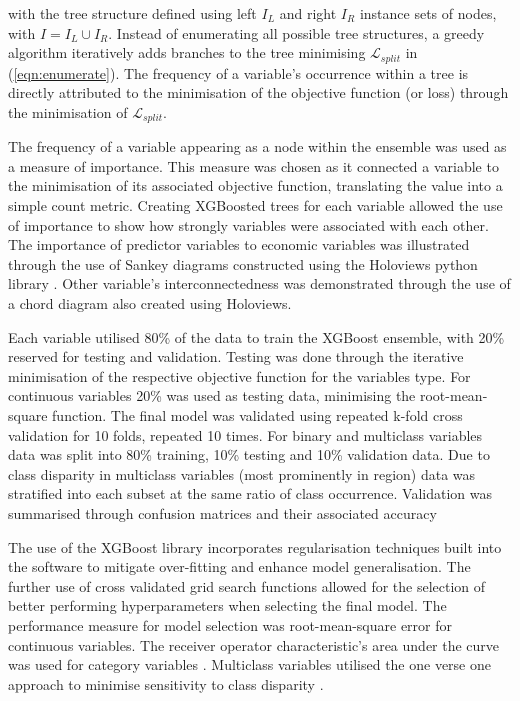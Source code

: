 \documentclass[review,12pt,authoryear]{elsarticle}
\begin{document}
\begin{linenumbers}
with the tree structure defined using left $I_L$ and right $I_R$ instance sets of nodes, with $I = I_L \cup I_R$. Instead of enumerating all possible tree structures, a greedy algorithm iteratively adds branches to the tree minimising $ \mathcal{L}_{split} $ in (\ref{eqn:enumerate}). The frequency of a variable's occurrence within a tree is directly attributed to the minimisation of the objective function (or loss) through the minimisation of  $ \mathcal{L}_{split} $.
\par
The frequency of a variable appearing as a node within the ensemble was used as a measure of importance. This measure was chosen as it connected a variable to the minimisation of its associated objective function, translating the value into a simple count metric. Creating XGBoosted trees for each variable allowed the use of importance to show how strongly variables were associated with each other. The importance of predictor variables to economic variables was illustrated through the use of Sankey diagrams constructed using the Holoviews python library \citep{philipp_rudiger_2020_3904606}. Other variable's interconnectedness was demonstrated through the use of a chord diagram also created using Holoviews.
\par
Each variable utilised 80\% of the data to train the XGBoost ensemble, with 20\% reserved for testing and validation. Testing was done through the iterative minimisation of the respective objective function for the variables type. For continuous variables 20\% was used as testing data, minimising the root-mean-square function. The final model was validated using repeated k-fold cross validation for 10 folds, repeated 10 times.
 For  binary and multiclass variables data was split into 80\% training, 10\% testing and 10\% validation data. Due to class disparity in multiclass variables (most prominently in region) data was stratified into each subset at the same ratio of class occurrence. Validation was summarised through confusion matrices and their associated accuracy 
\par
The use of the XGBoost library incorporates regularisation techniques built into the software to mitigate over-fitting and enhance model generalisation. The further use of cross validated grid search functions allowed for the selection of better performing hyperparameters when selecting the final model. The performance measure for model selection was root-mean-square error for continuous variables. The receiver operator characteristic's area under the curve was used for category variables \citep{hanley1982meaning}. Multiclass variables utilised the one verse one approach to minimise sensitivity to class disparity \citep{ferriExperimentalComparisonPerformance2009,handSimpleGeneralisationArea2001}.


\end{linenumbers}
\end{document}
